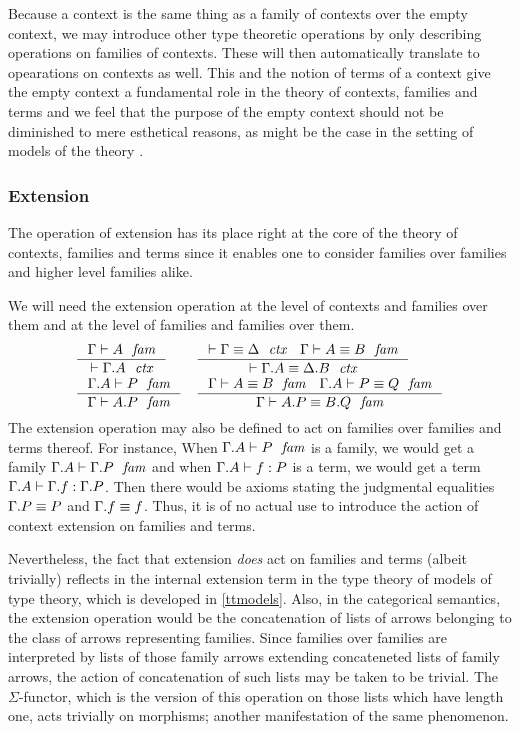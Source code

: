 Because a context is the same thing as a family of contexts over the empty
context, we may introduce other type theoretic operations by only describing
operations on families of contexts. These will then automatically translate
to opearations on contexts as well. This and the notion of terms of a context
give the empty context a fundamental role in the theory of contexts, families
and terms and we feel that the purpose of the empty context should not be
diminished to mere esthetical reasons, as might be the case in the setting
of models of the theory \cite{Awodey2013}.

\subsubsection{Extension}
\label{extension}
The operation of extension has its place right at the core of the theory of
contexts, families and terms since it enables one to consider families over
families and higher level families alike.

We will need the extension operation at the level of contexts and families 
over them and at the level of families and families over them. 
\begin{align}
& \inference
  { \jfam{\Gamma}{A}
    }
  { \jctx{\ctxext{\Gamma}{A}}
    }
& & \inference
    { \jctxeq{\Gamma}{\Delta}
      \jfameq{\Gamma}{A}{B}
      }
    { \jctxeq{\ctxext{\Gamma}{A}}{\ctxext{\Delta}{B}}
      }
    \\
& \inference
  { \jfam{{\Gamma}{A}}{P}
    }
  { \jfam{\Gamma}{\ctxext{A}{P}}
    }
& & \inference
    { \jfameq{\Gamma}{A}{B} 
      \jfameq{{\Gamma}{A}}{P}{Q}
      }
    { \jfameq{\Gamma}{\ctxext{A}{P}}{\ctxext{B}{Q}}
      }
\end{align}
The extension operation may also be defined to act on families over families
and terms thereof. For instance, When $\jfam{{\Gamma}{A}}{P}$ is a family,
we would get a family $\jfam{{\Gamma}{A}}{{\Gamma}{P}}$ and when
$\jterm{{\Gamma}{A}}{P}{f}$ is a term, we would get a term
$\jterm{{\Gamma}{A}}{{\Gamma}{P}}{\ctxext{\Gamma}{f}}$. Then there would be
axioms stating the judgmental equalities $\ctxext{\Gamma}{P}\jdeq P$ and
$\ctxext{\Gamma}{f}\jdeq f$. Thus, it is of no actual use to introduce the
action of context extension on families and terms.

Nevertheless, the fact that extension \emph{does} act on families
and terms (albeit trivially) reflects in the internal extension term in the type theory of
models of type theory, which is developed in \autoref{ttmodels}. Also, in the
categorical semantics, the extension operation would be the concatenation of
lists of arrows belonging to the class of arrows representing families. Since
families over families are interpreted by lists of those family arrows extending
concateneted lists of family arrows, the action of concatenation of such lists
may be taken to be trivial. The $\Sigma$-functor, which is the version of this
operation on those lists which have length one, acts trivially on morphisms;
another manifestation of the same phenomenon.

